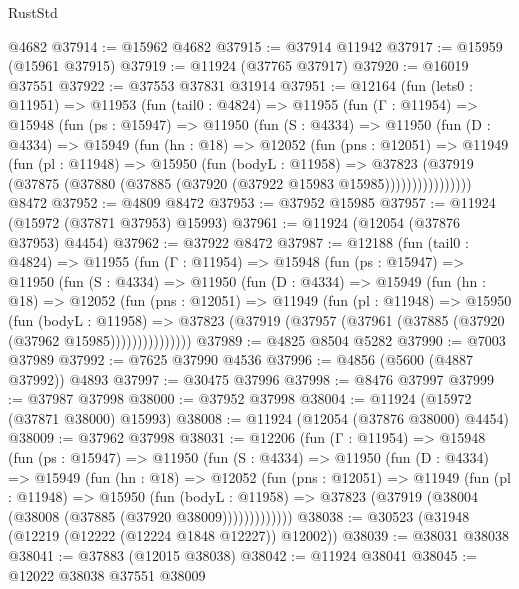 \begin{lexlean}{RustStd}
\begin{coremodule}
{\begin{coremodule}
{{{{{{{{{{{{{{{{{{{{{{{{{{{{{{{{{{{{{{{{{{{{{{{{{{{{{{{{{{{{{{{{{{{{{{{{{{{{{{{{    @4682
@37914 := @15962 @4682
@37915 := @37914 @11942
@37917 := @15959 (@15961 @37915)
@37919 := @11924 (@37765 @37917)
@37920 := @16019 @37551
@37922 := @37553 @37831 @31914
@37951 := @12164
    (fun (lets0 : @11951) =>
    @11953
      (fun (tail0 : @4824) =>
      @11955
        (fun (Γ : @11954) =>
        @15948
          (fun (ps : @15947) =>
          @11950
            (fun (S : @4334) =>
            @11950
              (fun (D : @4334) =>
              @15949
                (fun (hn : @18) =>
                @12052
                  (fun (pns : @12051) =>
                  @11949
                    (fun (pl : @11948) =>
                    @15950
                      (fun (bodyL : @11958) =>
                      @37823
                        (@37919
                          (@37875 (@37880 (@37885 (@37920 (@37922 @15983 @15985))))))))))))))))
    @8472
@37952 := @4809 @8472
@37953 := @37952 @15985
@37957 := @11924 (@15972 (@37871 @37953) @15993)
@37961 := @11924 (@12054 (@37876 @37953) @4454)
@37962 := @37922 @8472
@37987 := @12188
    (fun (tail0 : @4824) =>
    @11955
      (fun (Γ : @11954) =>
      @15948
        (fun (ps : @15947) =>
        @11950
          (fun (S : @4334) =>
          @11950
            (fun (D : @4334) =>
            @15949
              (fun (hn : @18) =>
              @12052
                (fun (pns : @12051) =>
                @11949
                  (fun (pl : @11948) =>
                  @15950
                    (fun (bodyL : @11958) =>
                    @37823 (@37919 (@37957 (@37961 (@37885 (@37920 (@37962 @15985)))))))))))))))
@37989 := @4825 @8504 @5282
@37990 := @7003 @37989
@37992 := @7625 @37990 @4536
@37996 := @4856 (@5600 (@4887 @37992)) @4893
@37997 := @30475 @37996
@37998 := @8476 @37997
@37999 := @37987 @37998
@38000 := @37952 @37998
@38004 := @11924 (@15972 (@37871 @38000) @15993)
@38008 := @11924 (@12054 (@37876 @38000) @4454)
@38009 := @37962 @37998
@38031 := @12206
    (fun (Γ : @11954) =>
    @15948
      (fun (ps : @15947) =>
      @11950
        (fun (S : @4334) =>
        @11950
          (fun (D : @4334) =>
          @15949
            (fun (hn : @18) =>
            @12052
              (fun (pns : @12051) =>
              @11949
                (fun (pl : @11948) =>
                @15950
                  (fun (bodyL : @11958) =>
                  @37823 (@37919 (@38004 (@38008 (@37885 (@37920 @38009)))))))))))))
@38038 := @30523 (@31948 (@12219 (@12222 (@12224 @1848 @12227)) @12002))
@38039 := @38031 @38038
@38041 := @37883 (@12015 @38038)
@38042 := @11924 @38041
@38045 := @12022 @38038 @37551 @38009
}}}}}}}}}}}}}}}}}}}}}}}}}}}}}}}}}}}}}}}}}}}}}}}}}}}}}}}}}}}}}}}}}}}}}}}}}}}}}}}}
\end{coremodule}}
\end{coremodule}
\end{lexlean}

